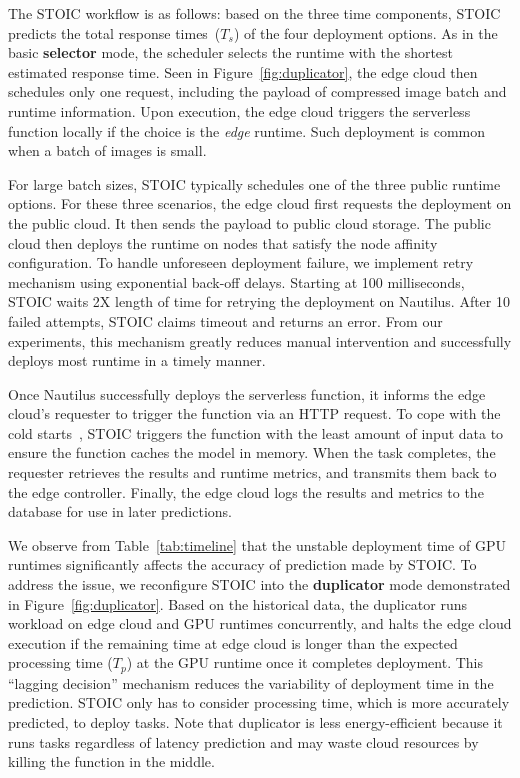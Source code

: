 The STOIC workflow is as follows: based on the three time components, STOIC predicts the total response times~($T_s$) of the four deployment options. As in the basic \textbf{selector} mode, the scheduler selects the runtime with the shortest estimated response time. Seen in Figure~\ref{fig:duplicator}, the edge cloud then schedules only one request, including the payload of compressed image batch and runtime information. Upon execution, the edge cloud triggers the serverless function locally if the choice is the \textit{edge} runtime. Such deployment is common when a batch of images is small. 

For large batch sizes, STOIC typically schedules one of the three public runtime options. For these three scenarios, the edge cloud first requests the deployment on the public cloud. It then sends the payload to public cloud storage. The public cloud then deploys the runtime on nodes that satisfy the node affinity configuration. To handle unforeseen deployment failure, we implement retry mechanism using exponential back-off delays. Starting at 100 milliseconds, STOIC waits 2X length of time for retrying the deployment on Nautilus. After 10 failed attempts, STOIC claims timeout and returns an error. From our experiments, this mechanism greatly reduces manual intervention and successfully deploys most runtime in a timely manner.
 
Once Nautilus successfully deploys the serverless function, it informs the edge cloud's requester to trigger the function via an HTTP request. To cope with the cold starts~\cite{ref:coldstart}, STOIC triggers the function with the least amount of input data to ensure the function caches the model in memory. When the task completes, the requester retrieves the results and runtime metrics, and transmits them back to the edge controller. Finally, the edge cloud logs the results and metrics to the database for use in later predictions. 

We observe from Table~\ref{tab:timeline} that the unstable deployment time of GPU runtimes significantly affects the accuracy of prediction made by STOIC. To address the issue, we reconfigure STOIC into the \textbf{duplicator} mode demonstrated in Figure~\ref{fig:duplicator}. Based on the historical data, the duplicator runs workload on edge cloud and GPU runtimes concurrently, and halts the edge cloud execution if the remaining time at edge cloud is longer than the expected processing time ($T_p$) at the GPU runtime once it completes deployment. This ``lagging decision'' mechanism reduces the variability of deployment time in the prediction. STOIC only has to consider processing time, which is more accurately predicted, to deploy tasks. Note that duplicator is less energy-efficient because it runs tasks regardless of latency prediction and may waste cloud resources by killing the function in the middle. 

